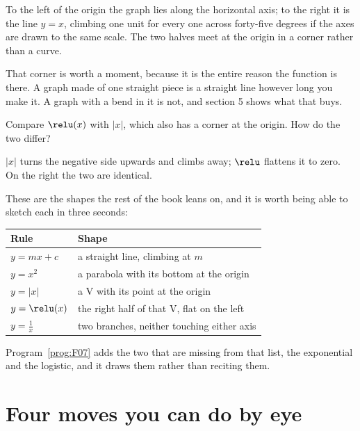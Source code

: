 \begin{fr}
To the left of the origin the graph lies along the horizontal axis; to the
right it is the line $y = x$, climbing one unit for every one across \dash{}
forty-five degrees if the axes are drawn to the same scale. The two halves meet
at the
origin in a corner rather than a curve.

That corner is worth a moment, because it is the entire reason the function is
there. A graph made of one straight piece is a straight line however long you
make it. A graph with a bend in it is not, and section 5 shows what that buys.

Compare $\relu(x)$ with $\lvert x \rvert$, which also has a corner at the
origin. How do the two differ?
\nextframe
\end{fr}

\begin{fr}
$\lvert x \rvert$ turns the negative side upwards and climbs away; $\relu$
flattens it to zero. On the right the two are identical.

These are the shapes the rest of the book leans on, and it is worth being able
to sketch each in three seconds:

\begin{center}
\begin{tabular}{ll}
\toprule
Rule & Shape \\
\midrule
$y = mx + c$ & a straight line, climbing at $m$ \\
$y = x^{2}$ & a parabola with its bottom at the origin \\
$y = \lvert x \rvert$ & a V with its point at the origin \\
$y = \relu(x)$ & the right half of that V, flat on the left \\
$y = \frac{1}{x}$ & two branches, neither touching either axis \\
\bottomrule
\end{tabular}
\end{center}

Program~\ref{prog:F07} adds the two that are missing from that list, the
exponential and the logistic, and it draws them rather than reciting them.
\end{fr}

\section{Four moves you can do by eye}
\label{sec:F05-moves}

